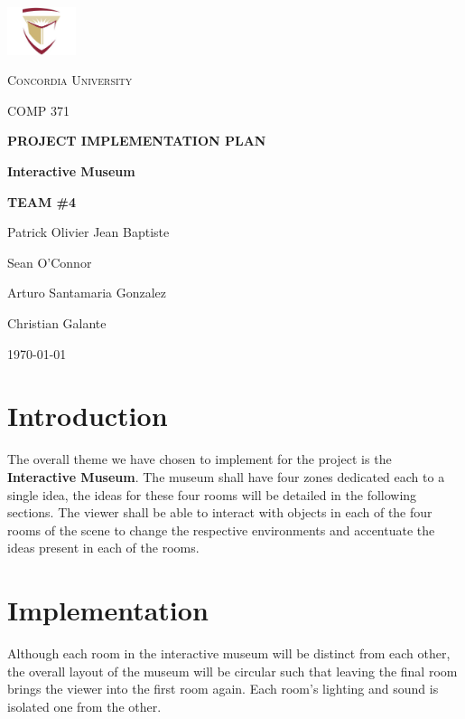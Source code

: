 \documentclass[12pt,a4paper]{report}
\begin{document}
\begin{titlepage}
	\centering
	\includegraphics[width=0.15\textwidth]{img/concordia_logo.jpg}\par\vspace{1cm}
	{\scshape\LARGE Concordia University \par}
	\vspace{1cm}
	{\scshape\Large COMP 371 \par}
	\vspace{1.5cm}
	{\huge\bfseries \uppercase{Project Implementation Plan} \par}
	\vspace{1cm}
	{\huge\bfseries Interactive Museum \par}
	\vspace{2cm}
	{\Large \uppercase{\textbf{Team \#4}}\par}
	\vspace{0.5cm}
	{Patrick Olivier Jean Baptiste\par}
	{Sean O'Connor\par}
	{Arturo Santamaria Gonzalez\par}
	{Christian Galante\par}
	\vfill
	\textsc{}

	\vfill

	{\large \today\par}
\end{titlepage}
\section*{Introduction}
\par The overall theme we have chosen to implement for the project is the \textbf{Interactive Museum}. The museum shall have four zones dedicated each to a single idea, the ideas for these four rooms will be detailed in the following sections. The viewer shall be able to interact with objects in each of the four rooms of the scene to change the respective environments and accentuate the ideas present in each of the rooms.
\section*{Implementation}
\par Although each room in the interactive museum will be distinct from each other, the overall layout of the museum will be circular such that leaving the final room brings the viewer into the first room again. Each room’s lighting and sound is isolated one from the other.
\end{document}
